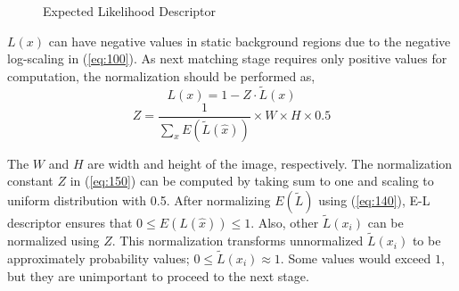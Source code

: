 \documentclass[conference]{IEEEtran}
\begin{document}
\begin{figure}[!t]
  \centering
  \label{fig:70}
  \hfill
  \hfill
  \caption{Expected Likelihood Descriptor}
\end{figure}
\begin{math} L(x) \end{math} can have negative values in static background regions due to the negative log-scaling in (\ref{eq:100}). As next matching stage requires only positive values for computation, the normalization should be performed as,
\begin{equation}\label{eq:140}
  L(x) = 1 - Z \cdot \tilde{L}(x)
\end{equation}
\begin{equation}\label{eq:150}
  Z = \frac{1}{ \sum_x E( \tilde{L}(\hat{x}) ) } \times W \times H \times 0.5
\end{equation}

The \begin{math} W \end{math} and \begin{math} H \end{math} are width and height of the image, respectively. The normalization constant \begin{math} Z \end{math} in (\ref{eq:150}) can be computed by taking sum to one and scaling to uniform distribution with 0.5. After normalizing \begin{math} E(\tilde{L}) \end{math} using (\ref{eq:140}), E-L descriptor ensures that \begin{math} 0 \le E( L(\hat{x})) \le 1 \end{math}. Also, other \begin{math} \tilde{L}( x_i ) \end{math}  can be normalized using \begin{math} Z \end{math}. This normalization transforms unnormalized \begin{math} \tilde{L}( x_i ) \end{math} to be approximately probability values; \begin{math} 0 \le \tilde{L}( x_i ) \approx 1 \end{math}. Some values would exceed \begin{math} 1 \end{math}, but they are unimportant to proceed to the next stage.
\end{document}
